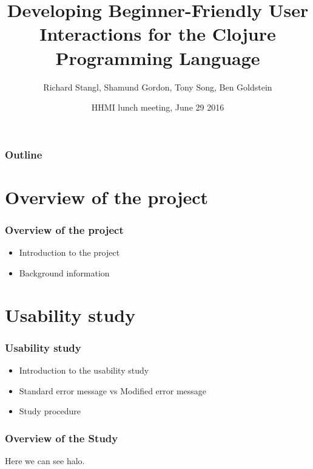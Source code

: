 \documentclass{beamer}
\begin{document}
\title{Developing Beginner-Friendly User Interactions for the Clojure Programming Language}
\author{Richard Stangl, Shamund Gordon, Tony Song, Ben Goldstein}
\date[]  
{HHMI lunch meeting, June 29 2016}

\begin{frame}
  \titlepage
\end{frame}


\begin{frame}

\frametitle{Outline}
\tableofcontents
\end{frame}

\section{Overview of the project}

\begin{frame}
  \frametitle{Overview of the project}
\begin{itemize}
\item Introduction to the project 
\item Background information
\end{itemize}
\end{frame}




\section{Usability study}

\begin{frame}
  \frametitle{Usability study}
\begin{itemize}
\item Introduction to the usability study 
\item Standard error message vs Modified error message
\item Study procedure
\end{itemize}
\end{frame}

\begin{frame}
  \frametitle{Overview of the Study}
\begin{figure}

\end{figure}

Here we can see halo. 
\end{frame}
\end{document}
